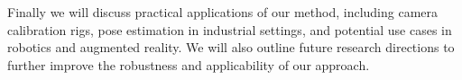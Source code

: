 Finally we will discuss practical applications of our method, including camera calibration rigs, pose estimation in industrial settings, and potential use cases in robotics and augmented reality. We will also outline future research directions to further improve the robustness and applicability of our approach.

